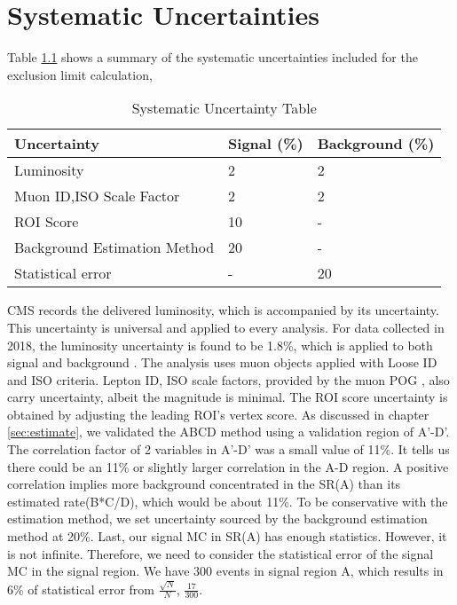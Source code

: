 \clearpage
\chapter{Systematic Uncertainties}\label{sec:systs}
Table \ref{tab:systab} shows a summary of the systematic uncertainties included for the exclusion limit calculation,

\begin{table}[htb!]
  \caption{Systematic Uncertainty Table}
  \begin{center}
    \begin{tabular}{l|l|l}\hline
     Uncertainty    & Signal (\%) & Background (\%)\\
      \hline
     Luminosity     & 2 & 2\\
      \hline
     Muon ID,ISO Scale Factor     & 2 & 2 \\
      \hline
     ROI Score      & 10 & -\\
      \hline
     Background Estimation Method     & 20 & - \\
      \hline
     Statistical error     & - & 20 \\
      \hline
    \end{tabular}
    \label{tab:systab}
  \end{center}
\end{table}
CMS records the delivered luminosity, which is accompanied by its uncertainty.
This uncertainty is universal and applied to every analysis.
For data collected in 2018, the luminosity uncertainty is found to be 1.8\%, which is applied to both signal and background \cite{lumiUnc18}.
The analysis uses muon objects applied with Loose ID and ISO criteria.
Lepton ID, ISO scale factors, provided by the muon POG \cite{muonpog}, also carry uncertainty, albeit the magnitude is minimal.
The ROI score uncertainty is obtained by adjusting the leading ROI's vertex score.
As discussed in chapter \ref{sec:estimate}, we validated the ABCD method using a validation region of A'-D'.
The correlation factor of 2 variables in A'-D' was a small value of 11\%.
It tells us there could be an 11\% or slightly larger correlation in the A-D region.
A positive correlation implies more background concentrated in the SR(A) than its estimated rate(B*C/D), which would be about 11\%.
To be conservative with the estimation method, we set uncertainty sourced by the background estimation method at 20\%.
Last, our signal MC in SR(A) has enough statistics.
However, it is not infinite.
Therefore, we need to consider the statistical error of the signal MC in the signal region.
We have 300 events in signal region A, which results in 6\% of statistical error from $\frac{\sqrt{N}}{N}$, $\frac{17}{300}$.
